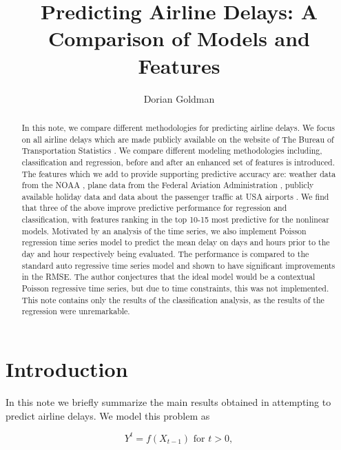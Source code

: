 \documentclass[twocolumn,showpacs,%
  nofootinbib,aps,superscriptaddress,%
  eqsecnum,prd,notitlepage,showkeys,10pt]{revtex4-1}
\begin{document}
\title{Predicting Airline Delays: A Comparison of Models and Features}
\author{Dorian Goldman}

\begin{abstract}
In this note, we compare different methodologies for predicting airline delays. We focus on all airline delays which are made publicly available on the website of
The Bureau of Transportation Statistics \cite{ontime}. We compare different modeling methodologies including, classification and regression, before and after an enhanced set of features
is introduced. The features which we add to provide supporting predictive accuracy are: weather data from the NOAA \cite{weather}, plane data from the Federal Aviation Administration \cite{aviation}, publicly available holiday data and data about the passenger traffic at USA airports \cite{boarding}. We find
that three of the above improve predictive performance for regression and classification, with features ranking in the top 10-15 most predictive for the nonlinear models. Motivated by an analysis of the time series, we also implement Poisson regression time series model to predict the mean delay on days and hours prior 
to the day and hour respectively being evaluated. The performance is compared to the standard auto regressive time series model and shown to have significant improvements in the RMSE. The author conjectures that the ideal model would be a contextual Poisson regressive time series, but due to time constraints, this was not implemented. This note contains only the results of the classification analysis, as the results of the regression were unremarkable.
\end{abstract}

\maketitle

\section{Introduction}

In this note we briefly summarize the main results obtained in attempting to predict airline delays. We model this problem as 

\begin{equation}
Y^t = f( X_{t-1}) \textrm{ for } t > 0,
\end{equation}
\end{document}
